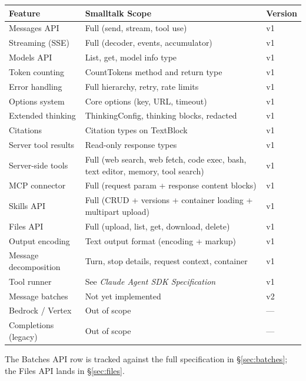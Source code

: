 \documentclass[a4paper,10pt,fleqn]{article}
\begin{document}
\begin{center}
\begin{tabularx}{\linewidth}{@{}lYl@{}}
\toprule
\textbf{Feature} & \textbf{Smalltalk Scope} & \textbf{Version} \\
\midrule
Messages API          & Full (send, stream, tool use)        & v1 \\
Streaming (SSE)       & Full (decoder, events, accumulator)  & v1 \\
Models API            & List, get, model info type           & v1 \\
Token counting        & CountTokens method and return type   & v1 \\
Error handling        & Full hierarchy, retry, rate limits   & v1 \\
Options system        & Core options (key, URL, timeout)     & v1 \\
Extended thinking     & ThinkingConfig, thinking blocks, redacted & v1 \\
Citations             & Citation types on TextBlock          & v1 \\
Server tool results   & Read-only response types             & v1 \\
Server-side tools     & Full (web search, web fetch, code exec, bash, text editor, memory, tool search) & v1 \\
MCP connector         & Full (request param + response content blocks) & v1 \\
Skills API            & Full (CRUD + versions + container loading + multipart upload) & v1 \\
Files API             & Full (upload, list, get, download, delete) & v1 \\
Output encoding       & Text output format (encoding + markup) & v1 \\
Message decomposition & Turn, stop details, request context, container & v1 \\
Tool runner           & See \emph{Claude Agent SDK Specification} & v1 \\
Message batches       & Not yet implemented                  & v2 \\
Bedrock / Vertex      & Out of scope                         & --- \\
Completions (legacy)  & Out of scope                         & --- \\
\bottomrule
\end{tabularx}
\end{center}

The Batches API row is tracked against the full specification in
\S\ref{sec:batches}; the Files API lands in \S\ref{sec:files}.
\end{document}
